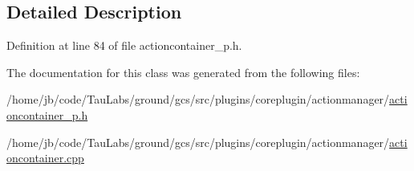 \subsection{\-Detailed \-Description}


\-Definition at line 84 of file actioncontainer\-\_\-p.\-h.



\-The documentation for this class was generated from the following files\-:\begin{DoxyCompactItemize}
\item 
/home/jb/code/\-Tau\-Labs/ground/gcs/src/plugins/coreplugin/actionmanager/\hyperlink{actioncontainer__p_8h}{actioncontainer\-\_\-p.\-h}\item 
/home/jb/code/\-Tau\-Labs/ground/gcs/src/plugins/coreplugin/actionmanager/\hyperlink{actioncontainer_8cpp}{actioncontainer.\-cpp}\end{DoxyCompactItemize}
